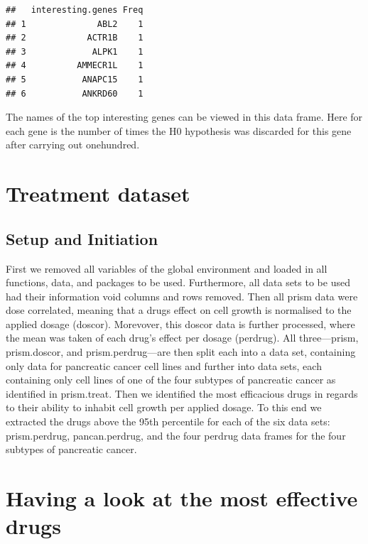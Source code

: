 \documentclass[
]{article}
\begin{document}
\begin{verbatim}
##   interesting.genes Freq
## 1              ABL2    1
## 2            ACTR1B    1
## 3             ALPK1    1
## 4          AMMECR1L    1
## 5           ANAPC15    1
## 6           ANKRD60    1
\end{verbatim}

The names of the top interesting genes can be viewed in this data frame.
Here for each gene is the number of times the H0 hypothesis was
discarded for this gene after carrying out onehundred.

\hypertarget{treatment-dataset}{%
\section{Treatment dataset}\label{treatment-dataset}}

\hypertarget{setup-and-initiation}{%
\subsection{Setup and Initiation}\label{setup-and-initiation}}

First we removed all variables of the global environment and loaded in
all functions, data, and packages to be used. Furthermore, all data sets
to be used had their information void columns and rows removed. Then all
prism data were dose correlated, meaning that a drugs effect on cell
growth is normalised to the applied dosage (doscor). Morevover, this
doscor data is further processed, where the mean was taken of each
drug's effect per dosage (perdrug). All three---prism, prism.doscor, and
prism.perdrug---are then split each into a data set, containing only
data for pancreatic cancer cell lines and further into data sets, each
containing only cell lines of one of the four subtypes of pancreatic
cancer as identified in prism.treat. Then we identified the most
efficacious drugs in regards to their ability to inhabit cell growth per
applied dosage. To this end we extracted the drugs above the 95th
percentile for each of the six data sets: prism.perdrug, pancan.perdrug,
and the four perdrug data frames for the four subtypes of pancreatic
cancer.

\hypertarget{having-a-look-at-the-most-effective-drugs}{%
\section{Having a look at the most effective
drugs}\label{having-a-look-at-the-most-effective-drugs}}
\end{document}
